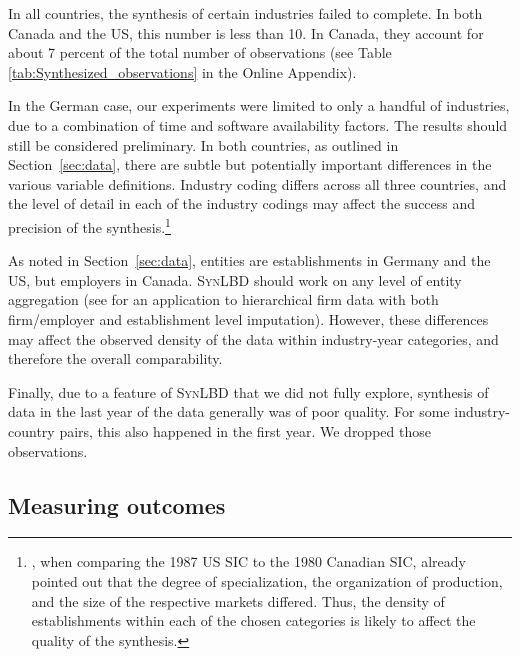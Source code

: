 \documentclass[10pt,twoside]{article}
\newcommand{\SynLBD}{\textsc{SynLBD}}
\begin{document}
In all countries, the synthesis of certain industries failed to complete. In both Canada and the US, this number is less than 10. In Canada, they account for about 7 percent of the total number of observations (see Table \ref{tab:Synthesized_observations} in the Online Appendix).

In the German case, our experiments were limited to only a handful of industries, due to a combination of time and software availability factors. The results should still be considered preliminary. In both countries, as outlined in Section~\ref{sec:data}, there are subtle but potentially important differences in the various variable definitions. Industry coding differs across all three countries, and the level of detail in each of the industry codings may affect the success and precision of the synthesis.\footnote{\textcite{StatisticsCanada1991}, when comparing the 1987 US \ac{SIC} to the 1980 Canadian \ac{SIC},  already pointed out that the degree of specialization, the organization of production, and the size of the respective markets differed. Thus, the density of establishments within each of the chosen categories is likely to affect the quality of the synthesis.} 

As noted in Section~\ref{sec:data}, entities are establishments in Germany and the US, but employers in Canada. \SynLBD{} should work on any level of entity aggregation (see \citet{RePEc:cen:wpaper:14-12} for an application to hierarchical firm data with both firm/employer and establishment level imputation). However, these differences may affect the observed density of the data within industry-year categories, and therefore the overall comparability. 

Finally, due to a feature of \SynLBD{} that we did not fully explore, synthesis of data in the last year of the data generally was of poor quality. For some industry-country pairs, this also happened in the first year. We dropped those observations. 

\subsection{Measuring outcomes}
\end{document}
